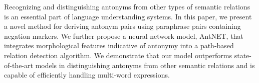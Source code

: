 Recognizing and distinguishing antonyms from other types of semantic relations is an essential part of language understanding systems. In this paper, we present a novel method for deriving antonym pairs using paraphrase pairs containing negation markers. We further propose a neural network model, AntNET, that integrates morphological features indicative of antonymy into a path-based relation detection algorithm. We demonstrate that our model outperforms state-of-the-art models in distinguishing antonyms from other semantic relations and is capable of efficiently handling multi-word expressions.
